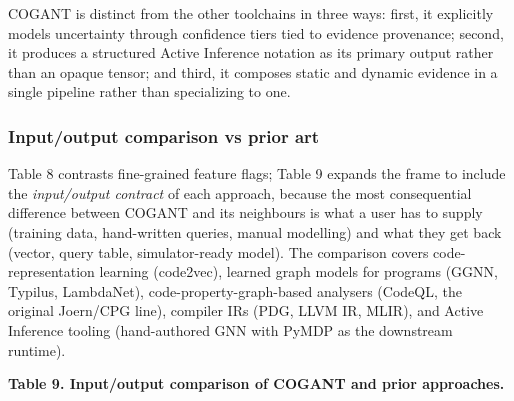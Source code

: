 \documentclass[
]{article}
\begin{document}
COGANT is distinct from the other toolchains in three ways: first, it
explicitly models uncertainty through confidence tiers tied to evidence
provenance; second, it produces a structured Active Inference notation
as its primary output rather than an opaque tensor; and third, it
composes static and dynamic evidence in a single pipeline rather than
specializing to one.

\subsubsection{Input/output comparison vs prior
art}\label{inputoutput-comparison-vs-prior-art}

Table 8 contrasts fine-grained feature flags; Table 9 expands the frame
to include the \emph{input/output contract} of each approach, because
the most consequential difference between COGANT and its neighbours is
what a user has to supply (training data, hand-written queries, manual
modelling) and what they get back (vector, query table, simulator-ready
model). The comparison covers code-representation learning (code2vec),
learned graph models for programs (GGNN, Typilus, LambdaNet),
code-property-graph-based analysers (CodeQL, the original Joern/CPG
line), compiler IRs (PDG, LLVM IR, MLIR), and Active Inference tooling
(hand-authored GNN with PyMDP as the downstream runtime).

\textbf{Table 9. Input/output comparison of COGANT and prior
approaches.}
\end{document}
